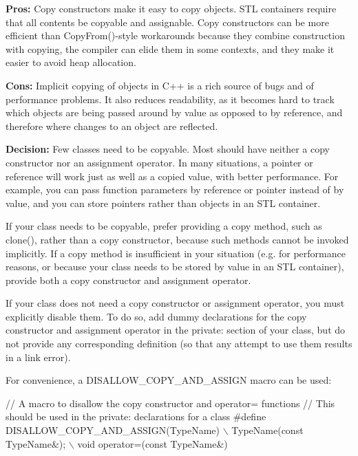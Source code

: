 {\bfseries Pros\+:} Copy constructors make it easy to copy objects. S\+TL containers require that all contents be copyable and assignable. Copy constructors can be more efficient than Copy\+From()-\/style workarounds because they combine construction with copying, the compiler can elide them in some contexts, and they make it easier to avoid heap allocation.

{\bfseries Cons\+:} Implicit copying of objects in C++ is a rich source of bugs and of performance problems. It also reduces readability, as it becomes hard to track which objects are being passed around by value as opposed to by reference, and therefore where changes to an object are reflected.

{\bfseries Decision\+:} Few classes need to be copyable. Most should have neither a copy constructor nor an assignment operator. In many situations, a pointer or reference will work just as well as a copied value, with better performance. For example, you can pass function parameters by reference or pointer instead of by value, and you can store pointers rather than objects in an S\+TL container.

If your class needs to be copyable, prefer providing a copy method, such as {\ttfamily clone()}, rather than a copy constructor, because such methods cannot be invoked implicitly. If a copy method is insufficient in your situation (e.\+g. for performance reasons, or because your class needs to be stored by value in an S\+TL container), provide both a copy constructor and assignment operator.

If your class does not need a copy constructor or assignment operator, you must explicitly disable them. To do so, add dummy declarations for the copy constructor and assignment operator in the private\+: section of your class, but do not provide any corresponding definition (so that any attempt to use them results in a link error).

For convenience, a {\ttfamily D\+I\+S\+A\+L\+L\+O\+W\+\_\+\+C\+O\+P\+Y\+\_\+\+A\+N\+D\+\_\+\+A\+S\+S\+I\+GN} macro can be used\+:


\begin{DoxyCode}
\textcolor{comment}{// A macro to disallow the copy constructor and operator= functions}
\textcolor{comment}{// This should be used in the private: declarations for a class}
\textcolor{preprocessor}{#define DISALLOW\_COPY\_AND\_ASSIGN(TypeName) \(\backslash\)}
\textcolor{preprocessor}{  TypeName(const TypeName&);               \(\backslash\)}
\textcolor{preprocessor}{  void operator=(const TypeName&)}
\end{DoxyCode}


